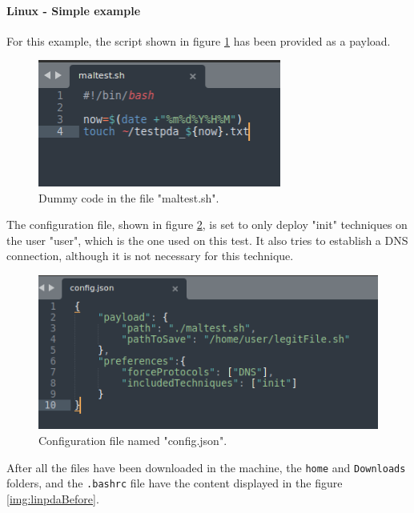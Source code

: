 \paragraph{Linux - Simple example}
For this example, the script shown in figure \ref{img:linpdaMaltest} has been provided as a payload.

\begin{figure}[!ht]
	\centering
	\includegraphics[width=8cm]{img/maltest}
	\caption{Dummy code in the file "maltest.sh".}
	\label{img:linpdaMaltest}
\end{figure}

\pagebreak
The configuration file, shown in figure \ref{img:linpdaConfigfile}, is set to only deploy "init" techniques on the user "user", which is the one used on this test. It also tries to establish a DNS connection, although it is not necessary for this technique.

\begin{figure}[!ht]
	\centering
	\includegraphics[width=12cm]{img/linPDA-configfile}
	\caption{Configuration file named "config.json".}
	\label{img:linpdaConfigfile}
\end{figure}

After all the files have been downloaded in the machine, the \texttt{home} and \texttt{Downloads} folders, and the \texttt{.bashrc} file have the content displayed in the figure \ref{img:linpdaBefore}.

